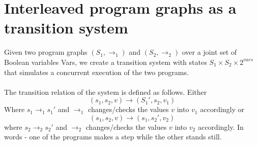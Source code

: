 \documentclass{article}[18pt]
\begin{document}
\section{Interleaved program graphs as a transition system}
Given two program graphs $(S_1,\rightarrow_1)$ and $(S_2,\rightarrow_2)$ over a joint set of Boolean variables Vars, we create a transition system with states $S_1\times S_2\times 2^{vars}$ that simulates a concurrent execution of the two programs.\\
\\
The transition relation of the system is defined as follows. Either
$$(s_1,s_2,v)\rightarrow (S_1',s_2,v_1)$$
Where $s_1\rightarrow_1s_1'$ and $\rightarrow_1$ changes/checks the values $v$ into $v_1$ accordingly or
$$(s_1,s_2,v)\rightarrow (s_1,s_2',v_2)$$
where $s_2\rightarrow_2s_2'$ and $\rightarrow_2$ changes/checks the values $v$ into $v_2$ accordingly. In words - one of the programs makes a step while the other stands still.
\end{document}
